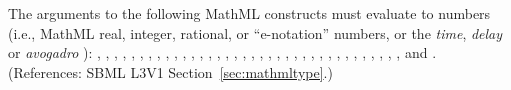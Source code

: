 The arguments to the following MathML constructs must evaluate to 
numbers (i.e., MathML real, integer, rational, or ``e-notation'' numbers,
or the \emph{time}, \emph{delay} or \emph{avogadro} ):
, , , ,
, , , ,
, , , ,
, , , , ,
, , , , ,
, , , , ,
, , , , ,
, , , , and .
(References: SBML L3V1 Section~\ref{sec:mathmltype}.)

